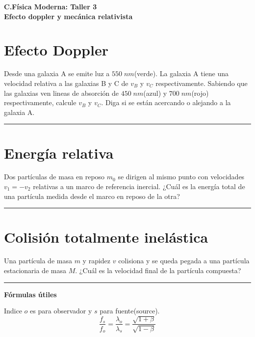 \documentclass[12pt]{article}
\begin{document}
 
\begin{center}
\Large \textbf{C.Física Moderna: Taller 3}\\
\normalsize \textbf{Efecto doppler y mecánica relativista}
\end{center}
 
  

\section{Efecto Doppler}

Desde una galaxia A se emite luz a $550\; nm$(verde). La galaxia A tiene una velocidad relativa a las galaxias B y C de $v_B$ y $v_C$ respectivamente. Sabiendo que las galaxias ven lineas de absorción  de $450\; nm$(azul) y $700\;nm$(rojo) respectivamente, calcule $v_B$ y $v_C$. Diga si se están acercando o alejando a la galaxia A.





\noindent\rule{16.5cm}{0.4pt}



\section{Energía relativa}

Dos partículas de masa en reposo $m_0$ se dirigen al mismo punto con velocidades $v_1 = -v_2$ relativas
a un marco de referencia inercial. ¿Cuál es la energía total de una partícula medida desde el marco
en reposo de la otra?





\noindent\rule{16.5cm}{0.4pt}



\section{Colisión totalmente inelástica}


 Una partícula de masa $m$ y rapidez $v$ colisiona y se queda pegada a una partícula estacionaria
de masa $M$. ¿Cuál es la velocidad final de la partícula compuesta?

\noindent\rule{16.5cm}{0.4pt}


\textbf{Fórmulas útiles}

Indice $o$ es para observador y $s$ para fuente(source).
\begin{equation*}
\frac{f_s}{f_o} = \frac{\lambda_o}{\lambda_s} = \frac{\sqrt{1+\beta}}{\sqrt{1-\beta}}
\end{equation*}
\end{document}
